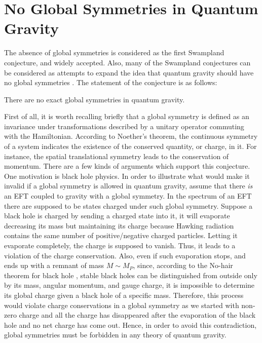 \section{No Global Symmetries in Quantum Gravity}
The absence of global symmetries is considered as the first Swampland conjecture, and widely accepted. Also, many of the Swampland conjectures can be considered as attempts to expand the idea that quantum gravity should have no global symmetries \parencite{banks_symmetries_2011}. The statement of the conjecture is as follows:
\begin{tcolorbox}[title=No Global Symmetries Conjecture,
    title filled=false,
    colback=blue!5!white,
    colframe=blue!75!black]
    There are no exact global symmetries in quantum gravity.  %
\end{tcolorbox} 
First of all, it is worth recalling briefly that a global symmetry is defined as an invariance under transformations described by a unitary operator commuting with the Hamiltonian. According to Noether's theorem, the continuous symmetry of a system indicates the existence of the conserved quantity, or charge, in it. For instance, the spatial translational symmetry leads to the conservation of momentum. There are a few kinds of arguments which support this conjecture. One motivation is black hole physics. In order to illustrate what would make it invalid if a global symmetry is allowed in quantum gravity, assume that there \emph{is} an EFT coupled to gravity with a global symmetry. In the spectrum of an EFT there are supposed to be states charged under such global symmetry. Suppose a black hole is charged by sending a charged state into it, it will evaporate decreasing its mass but maintaining its charge because Hawking radiation contains the same number of positive/negative charged particles. Letting it evaporate completely, the charge is supposed to vanish. Thus, it leads to a violation of the charge conservation. Also, even if such evaporation stops, and ends up with a remnant of mass $M \sim M_{P}$, since, according to the No-hair theorem for black hole \parencite{agmon_lectures_2022, israel_event_1967}, stable black holes can be distinguished from outside only by its mass, angular momentum, and gauge charge, it is impossible to determine its global charge given a black hole of a specific mass. Therefore, this process would violate charge conservations in a global symmetry as we started with non-zero charge and all the charge has disappeared after the evaporation of the black hole and no net charge has come out. Hence, in order to avoid this contradiction, global symmetries must be forbidden in any theory of quantum gravity.\\
